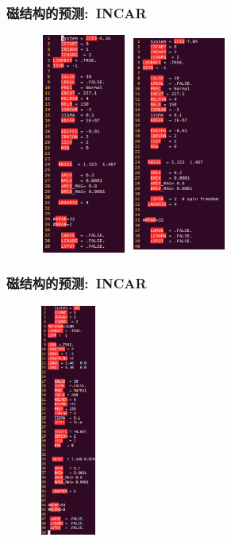 \documentclass[cjk,slidestop,compress,mathserif,blue]{beamer}
\begin{document}
\frame
{
	\frametitle{\textrm{}磁结构的预测:~\textrm{INCAR}}
\begin{figure}[h!]
\vspace*{-0.11in}
\centering
\includegraphics[height=2.85in,width=1.20in]{Figures/MagGene-CrI3-6.3-INCAR.png}
\hskip 0.3in
\includegraphics[height=2.85in,width=1.20in]{Figures/MagGene-CrI3-7.0-INCAR.png}
\label{Fig:CrI3-INCAR}
\end{figure}
}

\frame
{
	\frametitle{\textrm{}磁结构的预测:~\textrm{INCAR}}
\begin{figure}[h!]
\vspace*{-0.20in}
\centering
\includegraphics[height=3.00in,width=0.80in]{Figures/MagGene-UO2-INCAR.png}
\label{Fig:UO2-INCAR}
\end{figure}
}
\end{document}

